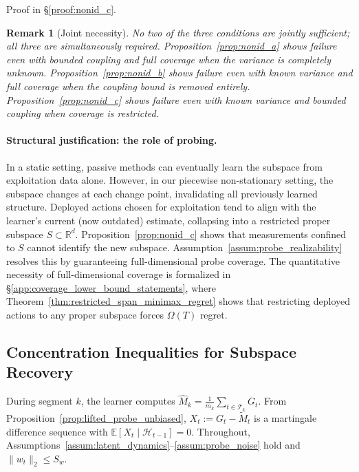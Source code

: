 \documentclass{article}
\newcommand{\R}{\mathbb{R}}
\newcommand{\E}{\mathbb{E}}
\newcommand{\cH}{\mathcal{H}}
\newcommand{\cT}{\mathcal{T}}
\newtheorem{remark}{Remark}
\begin{document}
Proof in \S\ref{proof:nonid_c}.

\begin{remark}[Joint necessity]
\label{rem:joint_necessity}
No two of the three conditions are jointly sufficient; all three are simultaneously required.
Proposition~\ref{prop:nonid_a} shows failure even with bounded coupling and full coverage when the variance is completely unknown.
Proposition~\ref{prop:nonid_b} shows failure even with known variance and full coverage when the coupling bound is removed entirely.
Proposition~\ref{prop:nonid_c} shows failure even with known variance and bounded coupling when coverage is restricted.
\end{remark}

\paragraph{Structural justification: the role of probing.}
In a static setting, passive methods can eventually learn the subspace from exploitation data alone.
However, in our piecewise non-stationary setting, the subspace changes at each change point, invalidating all previously learned structure.
Deployed actions chosen for exploitation tend to align with the learner's current (now outdated) estimate, collapsing into a restricted proper subspace $S \subset \R^d$.
Proposition~\ref{prop:nonid_c} shows that measurements confined to $S$ cannot identify the new subspace.
Assumption~\ref{assum:probe_realizability} resolves this by guaranteeing full-dimensional probe coverage.
The quantitative necessity of full-dimensional coverage is formalized in \S\ref{app:coverage_lower_bound_statements}, where Theorem~\ref{thm:restricted_span_minimax_regret} shows that restricting deployed actions to any proper subspace forces $\Omega(T)$ regret.

\subsection{Concentration Inequalities for Subspace Recovery}
\label{app:concentration}

During segment $k$, the learner computes $\widehat{M}_k = \frac{1}{m_k} \sum_{t \in \cT_k} G_t$.
From Proposition~\ref{prop:lifted_probe_unbiased}, $X_t := G_t - \widetilde{M}_t$ is a martingale difference sequence with $\E[X_t \mid \cH_{t-1}] = 0$.
Throughout, Assumptions~\ref{assum:latent_dynamics}--\ref{assum:probe_noise} hold and $\|w_t\|_2 \le S_w$.
\end{document}
